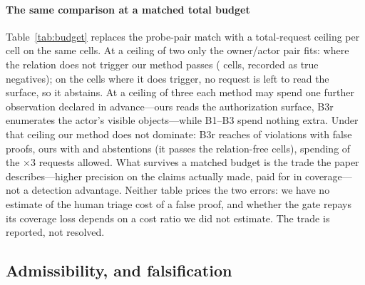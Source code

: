 



\paragraph{The same comparison at a matched total budget}
Table~\ref{tab:budget} replaces the probe-pair match with a total-request ceiling per cell
on the same \BgtCells{} cells. At a ceiling of two only the owner/actor pair fits: where the
relation does not trigger our method passes (\BgtOursPassCapTwo{} cells, recorded as true
negatives); on the \BgtOursAbstainCapTwo{} cells where it does trigger, no request is left
to read the surface, so it abstains. At a ceiling of three each method may spend one further
observation declared in advance---ours reads the authorization surface, B3r enumerates the
actor's visible objects---while B1--B3 spend nothing extra. Under that ceiling our method
does not dominate: B3r reaches \BgtBthreeRTpCapThree{} of \BgtViolations{} violations with
\BgtBthreeRFpCapThree{} false proofs, ours \BgtOursTpCapThree{} with
\BgtOursFpCapThree{} and \BgtOursAbstainCapThree{} abstentions (it passes the relation-free
\BgtOursPassCapThree{} cells), spending \BgtOursReqCapThree{} of the
\BgtCells{}$\times$3 requests allowed. What survives a matched budget is the trade the paper
describes---higher precision on the claims actually made, paid for in coverage---not a
detection advantage. Neither table prices the two errors: we have no estimate of the
human triage cost of a false proof, and whether the gate repays its coverage loss
depends on a cost ratio we did not estimate. The trade is reported, not resolved.

\subsection{Admissibility, and falsification}
\label{sec:admissibility}

